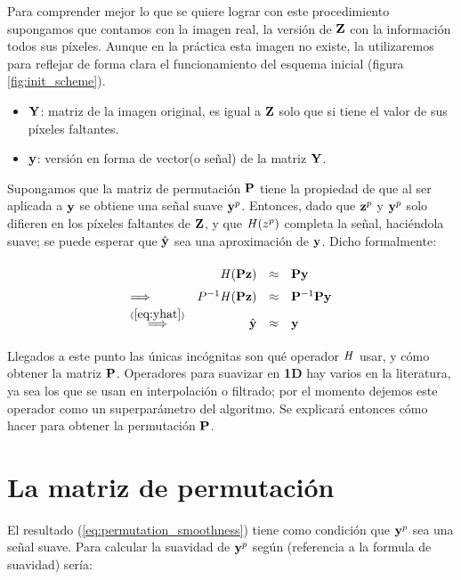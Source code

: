 Para comprender mejor lo que se quiere lograr con este procedimiento supongamos que contamos con la imagen real, la versi\'on de $\Z$ con la informaci\'on todos sus p\'ixeles. Aunque en la pr\'actica esta imagen no existe, la utilizaremos para reflejar de forma clara el funcionamiento del esquema inicial (figura \ref{fig:init_scheme}).

\begin{itemize}
	\item $\Y$: matriz de la imagen original, es igual a $\Z$ solo que si tiene el valor de sus p\'ixeles faltantes. 
	\item $\y$: versión en forma de vector(o señal) de la matriz $\Y$.
\end{itemize}

Supongamos que la matriz de permutaci\'on $\P$ tiene la propiedad de que al ser aplicada a $\y$ se obtiene una señal suave $\y^p$. Entonces, dado que $\z^p$ y $\y^p$ solo difieren en los p\'ixeles faltantes de $\Z$, y que $\H(z^p)$ completa la señal, haciéndola suave; se puede esperar que $\yhat$ sea una aproximaci\'on de $\y$. Dicho formalmente:

\begin{equation}
	\def\arraystretch{1.5}
	\begin{array}{lrcl}
		                                           &     \H (\P\z ) &\approx& \P\y        \\ 
		\Longrightarrow                            & P^{-1}\H(\P\z) &\approx& \P^{-1}\P\y \\
		\overset{(\ref{eq:yhat})}{\Longrightarrow} &          \yhat &\approx& \y          \\
	\end{array}
	\label{eq:permutation_smoothness}
\end{equation}

Llegados a este punto las únicas incógnitas son qu\'e operador $\H$ usar, y c\'omo obtener la matriz $\P$. Operadores para suavizar en \textbf{1D} hay varios en la literatura, ya sea los que se usan en interpolaci\'on o filtrado; por el momento dejemos este operador como un superpar\'ametro del algoritmo. Se explicar\'a entonces c\'omo hacer para obtener la permutaci\'on $\P$.

\section{La matriz de permutaci\'on}

El resultado (\ref{eq:permutation_smoothness}) tiene como condici\'on que $\y^p$ sea una señal suave. Para calcular la suavidad de $\y^p$ según (referencia a la formula de suavidad) ser\'ia:

